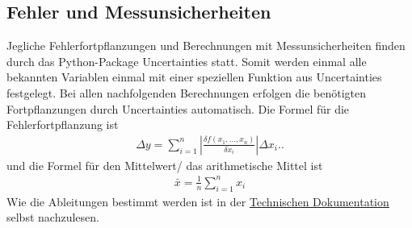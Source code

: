\documentclass[12pt]{article}
\begin{document}
\subsection{Fehler und Messunsicherheiten}\label{subsec:fehler-und-messunsicherheiten}
Jegliche Fehlerfortpflanzungen und Berechnungen mit Messunsicherheiten finden durch das Python-Package Uncertainties\cite{uncertainties} statt.
Somit werden einmal alle bekannten Variablen einmal mit einer speziellen Funktion aus Uncertainties festgelegt.
Bei allen nachfolgenden Berechnungen erfolgen die benötigten Fortpflanzungen durch Uncertainties automatisch.
Die Formel für die Fehlerfortpflanzung ist
\begin{align}
  \Delta y=\sum_{i=1}^n\left|\frac{\delta f\left(x_1, \ldots, x_n\right)}{\delta x_i}\right| \Delta x_i.\text{.}\label{gauss}
\end{align}
und die Formel für den Mittelwert/ das arithmetische Mittel ist
\begin{align}
  \bar{x}=\frac{1}{n}\sum_{i=1}^n x_i\label{mittel}
\end{align}
Wie die Ableitungen bestimmt werden ist in der \href{https://readthedocs.org/projects/uncertainties-python-package/downloads/pdf/latest/}{Technischen Dokumentation} selbst nachzulesen.
\end{document}
